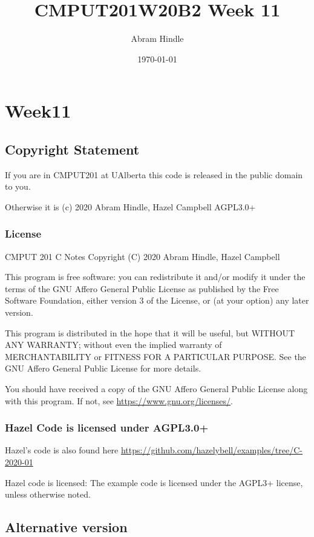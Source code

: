 \documentclass[11pt]{article}
\author{Abram Hindle}
\date{\today}
\title{CMPUT201W20B2 Week 11}
\begin{document}
\maketitle
\tableofcontents


\section{Week11}
\label{sec:orgfaacb6c}
\subsection{Copyright Statement}
\label{sec:org79d41cb}

If you are in CMPUT201 at UAlberta this code is released in the public
domain to you.

Otherwise it is (c) 2020 Abram Hindle, Hazel Campbell AGPL3.0+

\subsubsection{License}
\label{sec:orgb247f7f}

CMPUT 201 C Notes
Copyright (C) 2020 Abram Hindle, Hazel Campbell

This program is free software: you can redistribute it and/or modify
it under the terms of the GNU Affero General Public License as
published by the Free Software Foundation, either version 3 of the
License, or (at your option) any later version.

This program is distributed in the hope that it will be useful,
but WITHOUT ANY WARRANTY; without even the implied warranty of
MERCHANTABILITY or FITNESS FOR A PARTICULAR PURPOSE.  See the
GNU Affero General Public License for more details.

You should have received a copy of the GNU Affero General Public License
along with this program.  If not, see \url{https://www.gnu.org/licenses/}.


\subsubsection{Hazel Code is licensed under AGPL3.0+}
\label{sec:org8214f1a}

Hazel's code is also found here
\url{https://github.com/hazelybell/examples/tree/C-2020-01}

Hazel code is licensed: The example code is licensed under the AGPL3+
license, unless otherwise noted.

\subsection{Alternative version}
\label{sec:org9a56860}
\end{document}
